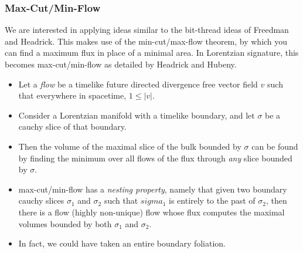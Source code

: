 \documentclass[8pt,aspectratio=169]{beamer}
\begin{document}
\begin{frame}
\frametitle{Max-Cut/Min-Flow}

\begin{minipage}[t]{0.55\linewidth}

We are interested in applying ideas similar to the bit-thread ideas of Freedman and Headrick. This makes use of the min-cut/max-flow theorem, by which you can find a maximum flux in place of a minimal area. In Lorentzian signature, this becomes max-cut/min-flow as detailed by Headrick and Hubeny.

\begin{itemize}

\item Let a {\it flow} be a timelike future directed divergence free vector field $v$ such that everywhere in spacetime, $1\leq |v|$.

\item Consider a Lorentzian manifold with a timelike boundary, and let $\sigma$ be a cauchy slice of that boundary.

\item Then the volume of the maximal slice of the bulk bounded by $\sigma$ can be found by finding the minimum over all flows of the flux through {\it any} slice bounded by $\sigma$. 

\item max-cut/min-flow has a {\it nesting property}, namely that given two boundary cauchy slices $\sigma_1$ and $\sigma_2$ such that $sigma_1$ is entirely to the past of $\sigma_2$, then there is a flow (highly non-unique) flow whose flux computes the maximal volumes bounded by both $\sigma_1$ and $\sigma_2$. 

\item In fact, we could have taken an entire boundary foliation.

\end{itemize}

\end{minipage}\hfill
%
\begin{minipage}[t]{0.44\linewidth}

\begin{figure}
    \begin{center}
    

\end{center}
\end{figure}
\end{minipage}
\end{frame}
\end{document}

